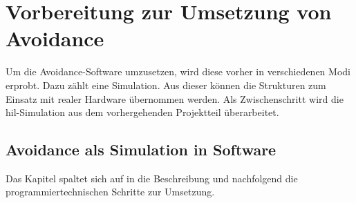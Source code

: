 \chapter{Vorbereitung zur Umsetzung von Avoidance}\label{chap:intro_avoidance}

Um die Avoidance-Software umzusetzen, wird diese vorher in verschiedenen Modi erprobt. Dazu zählt eine Simulation. Aus dieser können die Strukturen zum Einsatz mit realer Hardware übernommen werden. Als Zwischenschritt wird die \gls{hil}-Simulation aus dem vorhergehenden Projektteil überarbeitet.

\section{Avoidance als Simulation in Software}\label{chap:sim_gazebo}
Das Kapitel spaltet sich auf in die Beschreibung und nachfolgend die programmiertechnischen Schritte zur Umsetzung.

